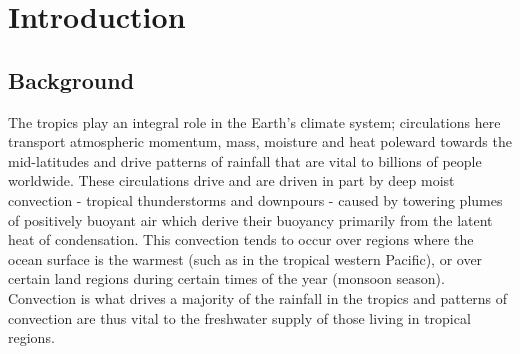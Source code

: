 \documentclass[letterpaper,12pt,titlepage,oneside,final]{book}
\begin{document}
 

\chapter{Introduction}
\section{Background}

The tropics play an integral role in the Earth's climate system; circulations here transport atmospheric momentum, mass, moisture and heat poleward towards the mid-latitudes and drive patterns of rainfall that are vital to billions of people worldwide. These circulations drive and are driven in part by deep moist convection - tropical thunderstorms and downpours - caused by towering plumes of positively buoyant air which derive their buoyancy primarily from the latent heat of condensation. This convection tends to occur over regions where the ocean surface is the warmest (such as in the tropical western Pacific), or over certain land regions during certain times of the year (monsoon season). Convection is what drives a majority of the rainfall in the tropics and patterns of convection are thus vital to the freshwater supply of those living in tropical regions.
\end{document}
